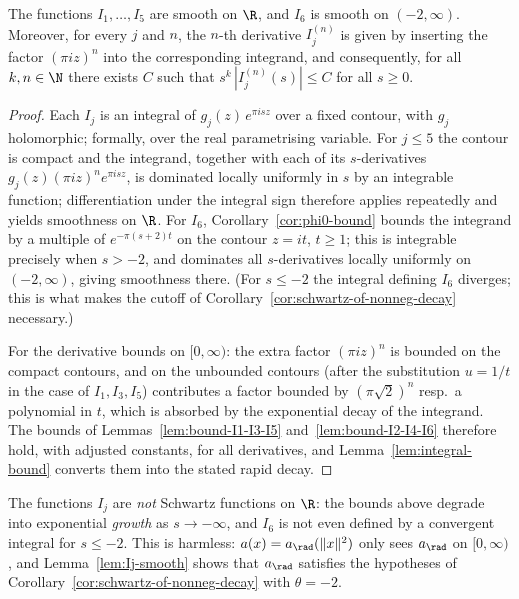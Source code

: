 \begin{lemma}\label{lem:Ij-smooth}
    The functions $I_1, \ldots, I_5$ are smooth on $\R$, and $I_6$ is smooth on $(-2, \infty)$. Moreover, for every $j$ and $n$, the $n$-th derivative $I_j^{(n)}$ is given by inserting the factor $(\pi i z)^n$ into the corresponding integrand, and consequently, for all $k, n \in \N$ there exists $C$ such that $s^k\, |I_j^{(n)}(s)| \leq C$ for all $s \geq 0$.
\end{lemma}
\begin{proof}
    Each $I_j$ is an integral of $g_j(z)\, e^{\pi i s z}$ over a fixed contour, with $g_j$ holomorphic; formally, over the real parametrising variable. For $j \leq 5$ the contour is compact and the integrand, together with each of its $s$-derivatives $g_j(z) (\pi i z)^n e^{\pi i s z}$, is dominated locally uniformly in $s$ by an integrable function; differentiation under the integral sign therefore applies repeatedly and yields smoothness on $\R$. For $I_6$, Corollary~\ref{cor:phi0-bound} bounds the integrand by a multiple of $e^{-\pi(s+2)t}$ on the contour $z = it$, $t \geq 1$; this is integrable precisely when $s > -2$, and dominates all $s$-derivatives locally uniformly on $(-2, \infty)$, giving smoothness there. (For $s \leq -2$ the integral defining $I_6$ diverges; this is what makes the cutoff of Corollary~\ref{cor:schwartz-of-nonneg-decay} necessary.)

    For the derivative bounds on $[0, \infty)$: the extra factor $(\pi i z)^n$ is bounded on the compact contours, and on the unbounded contours (after the substitution $u = 1/t$ in the case of $I_1, I_3, I_5$) contributes a factor bounded by $(\pi\sqrt{2})^n$ resp.\ a polynomial in $t$, which is absorbed by the exponential decay of the integrand. The bounds of Lemmas~\ref{lem:bound-I1-I3-I5} and~\ref{lem:bound-I2-I4-I6} therefore hold, with adjusted constants, for all derivatives, and Lemma~\ref{lem:integral-bound} converts them into the stated rapid decay.
\end{proof}

The functions $I_j$ are \emph{not} Schwartz functions on $\R$: the bounds above degrade into exponential \emph{growth} as $s \to -\infty$, and $I_6$ is not even defined by a convergent integral for $s \leq -2$. This is harmless: $a(x) = a_\rad(\|x\|^2)$ only sees $a_\rad$ on $[0, \infty)$, and Lemma~\ref{lem:Ij-smooth} shows that $a_\rad$ satisfies the hypotheses of Corollary~\ref{cor:schwartz-of-nonneg-decay} with $\theta = -2$.

